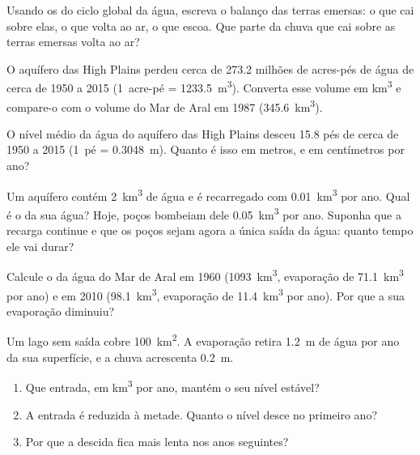 \begin{exercise}[$\star\star$]\label{exo:g10:freshwater-resources:8}
Usando os  do ciclo global da água, escreva o balanço das terras
emersas: o que cai sobre elas, o que volta ao ar, o que escoa. Que parte da
chuva que cai sobre as terras emersas volta ao ar?
\end{exercise}

\begin{exercise}[$\star\star$]\label{exo:g10:freshwater-resources:9}
O aquífero das High Plains perdeu cerca de \num{273.2} milhões de acres-pés
de água de cerca de 1950 a 2015 (\num{1}~acre-pé = \qty{1233.5}{m^3}).
Converta esse volume em \unit{km^3} e compare-o com o volume do Mar de Aral
em 1987 (\qty{345.6}{km^3}).
\end{exercise}

\begin{exercise}[$\star\star$]\label{exo:g10:freshwater-resources:10}
O nível médio da água do aquífero das High Plains desceu \num{15.8} pés de
cerca de 1950 a 2015 (\num{1}~pé = \qty{0.3048}{m}). Quanto é isso em
metros, e em centímetros por ano?
\end{exercise}

\begin{exercise}[$\star\star$]\label{exo:g10:freshwater-resources:11}
Um aquífero contém \qty{2}{km^3} de água e é recarregado com
\qty{0.01}{km^3} por ano. Qual é o  da sua água? Hoje,
poços bombeiam dele \qty{0.05}{km^3} por ano. Suponha que a recarga
continue e que os poços sejam agora a única saída da água: quanto tempo ele
vai durar?
\end{exercise}

\begin{exercise}[$\star\star\star$]\label{exo:g10:freshwater-resources:12}
Calcule o  da água do Mar de Aral em 1960
(\qty{1093}{km^3}, evaporação de \qty{71.1}{km^3} por ano) e em 2010
(\qty{98.1}{km^3}, evaporação de \qty{11.4}{km^3} por ano). Por que a sua
evaporação diminuiu?
\end{exercise}

\begin{exercise}[$\star\star\star$]\label{exo:g10:freshwater-resources:13}
Um lago sem saída cobre \qty{100}{km^2}. A evaporação retira
\qty{1.2}{m} de água por ano da sua superfície, e a chuva acrescenta
\qty{0.2}{m}.
\begin{enumerate}
  \item Que entrada, em \unit{km^3} por ano, mantém o seu nível estável?
  \item A entrada é reduzida à metade. Quanto o nível desce no primeiro
        ano?
  \item Por que a descida fica mais lenta nos anos seguintes?
\end{enumerate}
\end{exercise}

